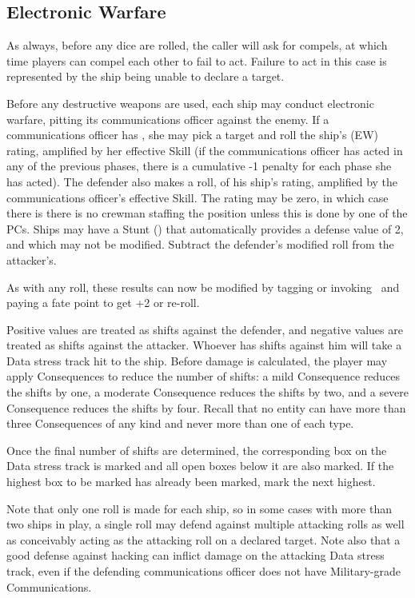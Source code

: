 \subsection{Electronic Warfare}\label{sec:Electronic Warfare}
\vfil
As always, before any dice are rolled, the caller will ask for compels, at which time players can compel each other to fail to act. Failure to act in this case is represented by the ship being unable to declare a target.

Before any destructive weapons are used, each ship may conduct electronic warfare, pitting its communications officer against the enemy. If a communications officer has , she may pick a target and roll the ship's  (EW) rating, amplified by her effective  Skill (if the communications officer has acted in any of the previous phases, there is a cumulative -1 penalty for each phase she has acted). The defender also makes a roll, of his ship's  rating, amplified by the communications officer's effective  Skill. The rating may be zero, in which case there is there is no crewman staffing the position unless this is done by one of the PCs. Ships may have a Stunt () that automatically provides a defense value of 2, and which may not be modified. Subtract the defender's modified roll from the attacker's.

As with any roll, these results can now be modified by tagging or invoking \Aspects\ and paying a fate point to get +2 or re-roll.

Positive values are treated as shifts against the defender, and
%
negative values are treated as shifts against the attacker.
%
Whoever has shifts against him will take a Data stress track hit to the ship. Before damage is calculated, the player may apply Consequences to reduce the number of shifts: a mild Consequence reduces the shifts by one, a moderate Consequence reduces the shifts by two, and a severe Consequence reduces the shifts by four. Recall that no entity can have more than three Consequences of any kind and never more than one of each type.


Once the final number of shifts are determined, the corresponding box on the Data stress track is marked and all open boxes below it are also marked. If the highest box to be marked has already been marked, mark the next highest.

Note that only one roll is made for each ship, so in some cases with more than two ships in play, a single roll may defend against multiple attacking rolls as well as conceivably acting as the attacking roll on a declared target. Note also that a good defense against hacking can inflict damage on the attacking Data stress track, even if the defending communications officer does not have Military-grade Communications.

